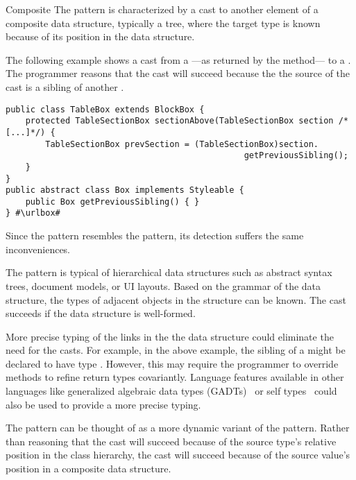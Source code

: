 \begin{pattern}{Composite}
The \thisp{} pattern is characterized by a cast to another element of a
composite data structure, typically a tree, where the target type is known because of its
position in the data structure.

\instances{}
The following example shows a cast from a %
---as returned by the  method---%
to a .
The programmer reasons that the cast will succeed because the 
the source of the cast is a sibling of another .

\def\urlvar{http://bit.ly/flyingsaucerproject_flyingsaucer_2N2nYbY}
\begin{verbatim}
public class TableBox extends BlockBox {
    protected TableSectionBox sectionAbove(TableSectionBox section /*[...]*/) {
        TableSectionBox prevSection = (TableSectionBox)section.
                                                getPreviousSibling();
    }
}
public abstract class Box implements Styleable {
    public Box getPreviousSibling() { }
} #\urlbox#
\end{verbatim}


\detection{}
Since the \thisp{} pattern resembles the  pattern,
its detection suffers the same inconveniences.


\issues{}
The pattern is typical of hierarchical data structures such as abstract syntax
trees, document models, or UI layouts. Based on the grammar of 
the data structure, the types of adjacent objects in the structure can be known.
The cast succeeds if the data structure is well-formed.

More precise typing of the links in the the data structure could 
eliminate the need for the casts. For example, in the above example,
the sibling of a  might be declared to have type
. However, this may require the programmer to override
methods to refine return types covariantly.
Language features available in other languages like generalized algebraic data types (GADTs)~\citep{gadts} or self types~\citep{bruceChallengingTypingIssues2003,scalaIndependentlyExtensible} could also be used to provide a more precise typing.

The pattern can be thought of as a more dynamic variant of the
 pattern. Rather than
reasoning that the cast will succeed because of the source type's relative position in the 
class hierarchy, the cast will succeed because of the source value's position
in a composite data structure.

\end{pattern}
